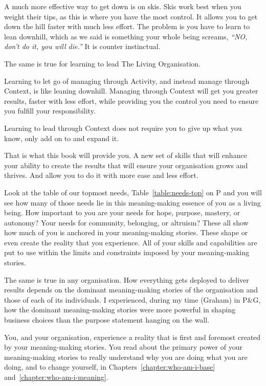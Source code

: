 \begin{longstoryblock}
A much more effective way to get down is on skis. Skis work best when you weight their tips, as this is where you have the most control. It allows you to get down the hill faster with much less effort. The problem is you have to learn to lean downhill, which as we said is something your whole being screams, \emph{“NO, don’t do it, you will die.”} It is counter instinctual.


The same is true for learning to lead The Living Organisation. 


Learning to let go of managing through Activity, and instead manage through Context, is like leaning downhill. Managing through Context will get you greater results, faster with less effort, while providing you the control you need to ensure you fulfill your responsibility. 


Learning to lead through Context does not require you to give up what you know, only add on to and expand it. 


That is what this book will provide you. A new set of skills that will enhance your ability to create the results that will ensure your organisation grows and thrives. And allow you to do it with more ease and less effort.
\end{longstoryblock}


Look at the table of our topmost needs, Table~\ref{table:needs-top} on P\pageref{table:needs-top} and you will see how many of those needs lie in this meaning\hyp{}making essence of you as a living being. How important to you are your needs for hope, purpose, mastery, or autonomy? Your needs for community, belonging, or altruism? These all show how much of you is anchored in your meaning\hyp{}making stories. These shape or even create the reality that you experience. All of your skills and capabilities are put to use within the limits and constraints imposed by your meaning\hyp{}making stories.


The same is true in any organisation. How everything gets deployed to deliver results depends on the dominant meaning\hyp{}making stories of the organisation and those of each of its individuals. I experienced, during my time (Graham) in P\&G, how the dominant meaning\hyp{}making stories were more powerful in shaping business choices than the purpose statement hanging on the wall.


You, and your organisation, experience a reality that is first and foremost created by your meaning\hyp{}making stories. You read about the primary power of your meaning\hyp{}making stories to really understand why you are doing what you are doing, and to change yourself, in Chapters~\ref{chapter:who-am-i-base} and~\ref{chapter:who-am-i-meaning}. 


